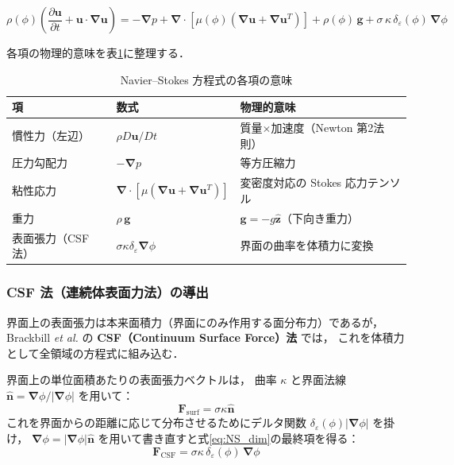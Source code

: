 \documentclass[12pt, a4paper, titlepage]{article}
\newcommand{\jp}[1]{{\normalfont\jpfont #1}}
\newcommand{\pd}[2]{\dfrac{\partial #1}{\partial #2}}
\newcommand{\bu}{\bm{u}}
\newcommand{\bg}{\bm{g}}
\newcommand{\bnabla}{\bm{\nabla}}
\newcommand{\de}{\delta_\varepsilon}
\begin{document}
\begin{tcolorbox}[mybox, title={\jp{One-Fluid Navier--Stokes 方程式（次元形）}}]
\begin{equation}
  \rho(\phi)\!\left(\pd{\bu}{t} + \bu\cdot\bnabla\bu\right)
  = -\bnabla p
  + \bnabla\cdot\!\left[\mu(\phi)\!\left(\bnabla\bu + \bnabla\bu^T\right)\right]
  + \rho(\phi)\,\bg
  + \sigma\,\kappa\,\de(\phi)\,\bnabla\phi
  \label{eq:NS_dim}
\end{equation}
\end{tcolorbox}

\jp{各項の物理的意味を表\ref{tab:NS_terms}に整理する．}

\begin{table}[h]
\centering
\caption{\jp{Navier--Stokes 方程式の各項の意味}}
\label{tab:NS_terms}
\begin{tabular}{@{}lll@{}}
\toprule
\jp{項} & \jp{数式} & \jp{物理的意味}\\
\midrule
\jp{慣性力（左辺）} & $\rho D\bu/Dt$ & \jp{質量}$\times$\jp{加速度（Newton 第2法則）}\\
\jp{圧力勾配力} & $-\bnabla p$ & \jp{等方圧縮力}\\
\jp{粘性応力} & $\bnabla\cdot[\mu(\bnabla\bu+\bnabla\bu^T)]$ & \jp{変密度対応の Stokes 応力テンソル}\\
\jp{重力} & $\rho\,\bg$ & \jp{$\bg = -g\hat{\bm{z}}$（下向き重力）}\\
\jp{表面張力（CSF法）} & $\sigma\kappa\de\bnabla\phi$ & \jp{界面の曲率を体積力に変換 \cite{Brackbill1992}}\\
\bottomrule
\end{tabular}
\end{table}

\subsubsection{CSF \jp{法（連続体表面力法）の導出}}

\jp{界面上の表面張力は本来面積力（界面にのみ作用する面分布力）であるが，
Brackbill \textit{et al.} \cite{Brackbill1992} の \textbf{CSF（Continuum Surface Force）法} では，
これを体積力として全領域の方程式に組み込む．}

\jp{界面上の単位面積あたりの表面張力ベクトルは，
曲率 $\kappa$ と界面法線 $\hat{\bm{n}} = \bnabla\phi/|\bnabla\phi|$ を用いて：}
\begin{equation}
  \bm{F}_{\mathrm{surf}} = \sigma\kappa\hat{\bm{n}}
\end{equation}
\jp{これを界面からの距離に応じて分布させるためにデルタ関数 $\de(\phi)|\bnabla\phi|$ を掛け，
$\bnabla\phi = |\bnabla\phi|\hat{\bm{n}}$ を用いて書き直すと式\eqref{eq:NS_dim}の最終項を得る：}
\begin{equation}
  \bm{F}_{\mathrm{CSF}} = \sigma\kappa\,\de(\phi)\,\bnabla\phi
\end{equation}
\end{document}
